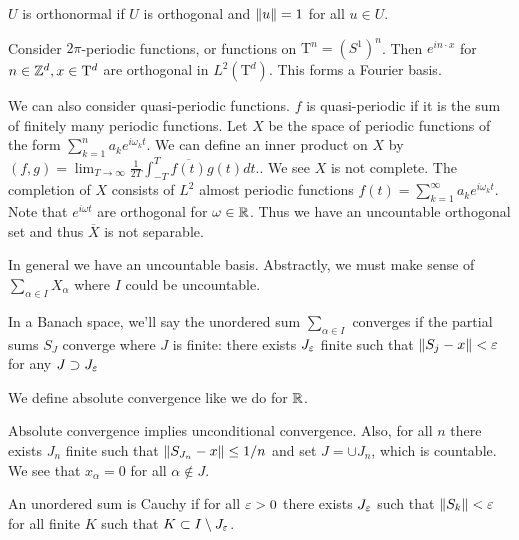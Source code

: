 \documentclass[10pt, twoside]{article}
\begin{document}
    \begin{defn}
        $U$ is orthonormal if $U$ is orthogonal and $\lVert u\rVert = 1$ for all $u \in U$.
    \end{defn}
    
    \begin{exm}
        Consider $2 \pi$-periodic functions, or functions on $\mathrm{T}^n = (S^1)^n$. Then $e^{in \cdot x}$ for $n \in \mathbb{Z}^d, x \in \mathrm{T}^d$ are orthogonal in $L^2(\mathrm{T}^d)$. This forms a Fourier basis.
    \end{exm}

    \begin{exm}
        We can also consider quasi-periodic functions. $f$ is quasi-periodic if it is the sum of finitely many periodic functions. Let $X$ be the space of periodic functions of the form $\sum_{k=1}^n a_k e^{i\omega_kt}$. We can define an inner product on $X$ by $(f,g) = \lim_{T \to \infty} \frac{1}{2T} \int_{-T}^T \overline{f(t)} g(t) dt.$. We see $X$ is not complete. The completion of $X$ consists of $L^2$ almost periodic functions $f(t) = \sum_{k=1}^{\infty} a_ke^{i\omega_k t}$. Note that $e^{i\omega t}$ are orthogonal for $\omega \in \mathbb{R}$. Thus we have an uncountable orthogonal set and thus $\overline{X}$ is not separable.
    \end{exm}

    In general we have an uncountable basis. Abstractly, we must make sense of $\sum_{\alpha \in I} X_{\alpha}$ where $I$ could be uncountable. 

    \begin{defn}
        In a Banach space, we'll say the unordered sum $\sum_{\alpha \in I}$ converges if the partial sums $S_J$ converge where $J$ is finite: there exists $J_{\varepsilon}$ finite such that $\lVert S_j - x\rVert < \varepsilon$ for any $J \supset J_{\varepsilon}$
    \end{defn}

    We define absolute convergence like we do for $\mathbb{R}$.

    \begin{lem}
        Absolute convergence implies unconditional convergence. Also, for all $n$ there exists $J_n$ finite such that $\lVert S_{J_n} - x\rVert \leq 1/n$ and set $J = \cup J_n$, which is countable. We see that $x_{\alpha} = 0$ for all $\alpha \notin J$.
    \end{lem}

    \begin{defn}
        An unordered sum is Cauchy if for all $\varepsilon > 0$ there exists $J_{\varepsilon}$ such that $\lVert S_k\rVert < \varepsilon$ for all finite $K$ such that $K \subset I \setminus J_{\varepsilon}$.
    \end{defn}
\end{document}
